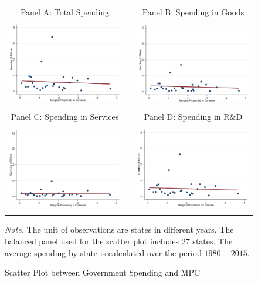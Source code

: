 \documentclass[dv_diss_main.tex]{subfiles}
\begin{document}
\begin{figure}[ht]
    \begin{center}
     
    \begin{tabular}[c]{ccc}
    
    \normalsize{Panel A: Total Spending} & & \normalsize{Panel B: Spending in Goods} \\
    {\includegraphics[height=1.5in,width=2.8in]{figures/graph_spendtot_mpc.png}} & & {\includegraphics[height=1.5in,width=2.8in]{figures/graph_spendgood_mpc.png}} \\[0.1in]
    
    \normalsize{Panel C: Spending in Services} & & \normalsize{Panel D: Spending in R\&D} \\
    {\includegraphics[height=1.5in,width=2.8in]{figures/graph_spendservice_mpc.png}} & & {\includegraphics[height=1.5in,width=2.8in]{figures/graph_spendrd_mpc.png}} \\[0.1in]
    
    
    \end{tabular} 
     \caption{Scatter Plot between Government Spending and MPC}
    \end{center}
    
    \label{fig:scatter_spendmpc}
    
    \footnotesize{\textit{Note. } The unit of observations are states in different years. The balanced panel used for the scatter plot includes $27$ states. The average spending by state is calculated over the period $1980-2015$.}

\end{figure}

 
\end{document}

